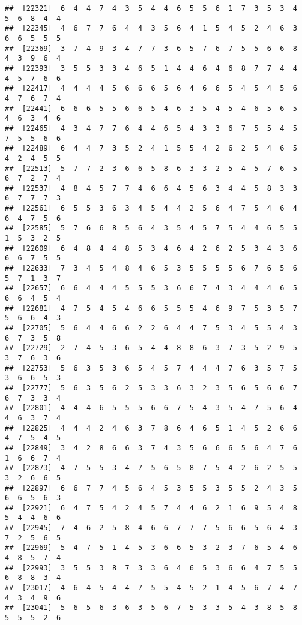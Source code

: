 \documentclass[
]{book}
\begin{document}
\begin{verbatim}
##  [22321]  6  4  4  7  4  3  5  4  4  6  5  5  6  1  7  3  5  3  4  5  6  8  4  4
##  [22345]  4  6  7  7  6  4  4  3  5  6  4  1  5  4  5  2  4  6  3  6  6  5  5  5
##  [22369]  3  7  4  9  3  4  7  7  3  6  5  7  6  7  5  5  6  6  8  4  3  9  6  4
##  [22393]  3  5  5  3  3  4  6  5  1  4  4  6  4  6  8  7  7  4  4  4  5  7  6  6
##  [22417]  4  4  4  4  5  6  6  6  5  6  4  6  6  5  4  5  4  5  6  4  7  6  7  4
##  [22441]  6  6  6  5  5  6  6  5  4  6  3  5  4  5  4  6  5  6  5  4  6  3  4  6
##  [22465]  4  3  4  7  7  6  4  4  6  5  4  3  3  6  7  5  5  4  5  7  5  5  6  6
##  [22489]  6  4  4  7  3  5  2  4  1  5  5  4  2  6  2  5  4  6  5  4  2  4  5  5
##  [22513]  5  7  7  2  3  6  6  5  8  6  3  3  2  5  4  5  7  6  5  6  7  2  7  4
##  [22537]  4  8  4  5  7  7  4  6  6  4  5  6  3  4  4  5  8  3  3  6  7  7  7  3
##  [22561]  6  5  5  3  6  3  4  5  4  4  2  5  6  4  7  5  4  6  4  6  4  7  5  6
##  [22585]  5  7  6  6  8  5  6  4  3  5  4  5  7  5  4  4  6  5  5  1  5  3  2  5
##  [22609]  6  4  8  4  4  8  5  3  4  6  4  2  6  2  5  3  4  3  6  6  6  7  5  5
##  [22633]  7  3  4  5  4  8  4  6  5  3  5  5  5  5  6  7  6  5  6  5  7  1  3  7
##  [22657]  6  6  4  4  4  5  5  5  3  6  6  7  4  3  4  4  4  6  5  6  6  4  5  4
##  [22681]  4  7  5  4  5  4  6  6  5  5  5  4  6  9  7  5  3  5  7  5  6  6  4  3
##  [22705]  5  6  4  4  6  6  2  2  6  4  4  7  5  3  4  5  5  4  3  6  7  3  5  8
##  [22729]  2  7  4  5  3  6  5  4  4  8  8  6  3  7  3  5  2  9  5  3  7  6  3  6
##  [22753]  5  6  3  5  3  6  5  4  5  7  4  4  4  7  6  3  5  7  5  3  6  6  5  3
##  [22777]  5  6  3  5  6  2  5  3  3  6  3  2  3  5  6  5  6  6  7  6  7  3  3  4
##  [22801]  4  4  4  6  5  5  5  6  6  7  5  4  3  5  4  7  5  6  4  4  6  3  7  4
##  [22825]  4  4  4  2  4  6  3  7  8  6  4  6  5  1  4  5  2  6  6  4  7  5  4  5
##  [22849]  3  4  2  8  6  6  3  7  4  3  5  6  6  6  5  6  4  7  6  1  6  6  7  4
##  [22873]  4  7  5  5  3  4  7  5  6  5  8  7  5  4  2  6  2  5  5  3  2  6  6  5
##  [22897]  6  6  7  7  4  5  6  4  5  3  5  5  3  5  5  2  4  3  5  6  6  5  6  3
##  [22921]  6  4  7  5  4  2  4  5  7  4  4  6  2  1  6  9  5  4  8  5  4  4  6  6
##  [22945]  7  4  6  2  5  8  4  6  6  7  7  7  5  6  6  5  6  4  3  7  2  5  6  5
##  [22969]  5  4  7  5  1  4  5  3  6  6  5  3  2  3  7  6  5  4  6  4  8  5  7  4
##  [22993]  3  5  5  3  8  7  3  3  6  4  6  5  3  6  6  4  7  5  5  6  8  8  3  4
##  [23017]  4  6  4  5  4  4  7  5  5  4  5  2  1  4  5  6  7  4  7  4  3  4  9  6
##  [23041]  5  6  5  6  3  6  3  5  6  7  5  3  3  5  4  3  8  5  8  5  5  5  2  6

\end{verbatim}
\end{document}
